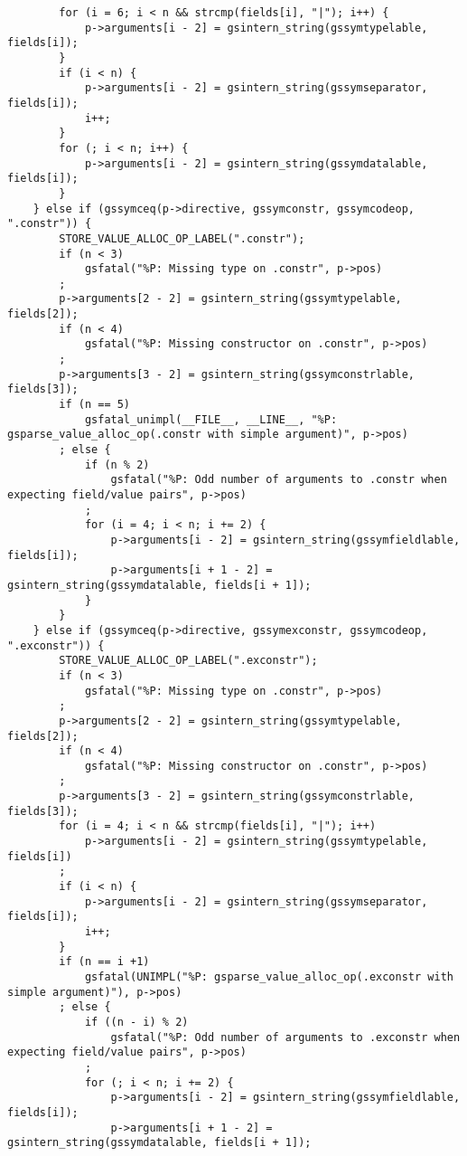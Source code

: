\documentclass{report}
\begin{document}
\begin{verbatim}
        for (i = 6; i < n && strcmp(fields[i], "|"); i++) {
            p->arguments[i - 2] = gsintern_string(gssymtypelable, fields[i]);
        }
        if (i < n) {
            p->arguments[i - 2] = gsintern_string(gssymseparator, fields[i]);
            i++;
        }
        for (; i < n; i++) {
            p->arguments[i - 2] = gsintern_string(gssymdatalable, fields[i]);
        }
    } else if (gssymceq(p->directive, gssymconstr, gssymcodeop, ".constr")) {
        STORE_VALUE_ALLOC_OP_LABEL(".constr");
        if (n < 3)
            gsfatal("%P: Missing type on .constr", p->pos)
        ;
        p->arguments[2 - 2] = gsintern_string(gssymtypelable, fields[2]);
        if (n < 4)
            gsfatal("%P: Missing constructor on .constr", p->pos)
        ;
        p->arguments[3 - 2] = gsintern_string(gssymconstrlable, fields[3]);
        if (n == 5)
            gsfatal_unimpl(__FILE__, __LINE__, "%P: gsparse_value_alloc_op(.constr with simple argument)", p->pos)
        ; else {
            if (n % 2)
                gsfatal("%P: Odd number of arguments to .constr when expecting field/value pairs", p->pos)
            ;
            for (i = 4; i < n; i += 2) {
                p->arguments[i - 2] = gsintern_string(gssymfieldlable, fields[i]);
                p->arguments[i + 1 - 2] = gsintern_string(gssymdatalable, fields[i + 1]);
            }
        }
    } else if (gssymceq(p->directive, gssymexconstr, gssymcodeop, ".exconstr")) {
        STORE_VALUE_ALLOC_OP_LABEL(".exconstr");
        if (n < 3)
            gsfatal("%P: Missing type on .constr", p->pos)
        ;
        p->arguments[2 - 2] = gsintern_string(gssymtypelable, fields[2]);
        if (n < 4)
            gsfatal("%P: Missing constructor on .constr", p->pos)
        ;
        p->arguments[3 - 2] = gsintern_string(gssymconstrlable, fields[3]);
        for (i = 4; i < n && strcmp(fields[i], "|"); i++)
            p->arguments[i - 2] = gsintern_string(gssymtypelable, fields[i])
        ;
        if (i < n) {
            p->arguments[i - 2] = gsintern_string(gssymseparator, fields[i]);
            i++;
        }
        if (n == i +1)
            gsfatal(UNIMPL("%P: gsparse_value_alloc_op(.exconstr with simple argument)"), p->pos)
        ; else {
            if ((n - i) % 2)
                gsfatal("%P: Odd number of arguments to .exconstr when expecting field/value pairs", p->pos)
            ;
            for (; i < n; i += 2) {
                p->arguments[i - 2] = gsintern_string(gssymfieldlable, fields[i]);
                p->arguments[i + 1 - 2] = gsintern_string(gssymdatalable, fields[i + 1]);

\end{verbatim}
\end{document}
